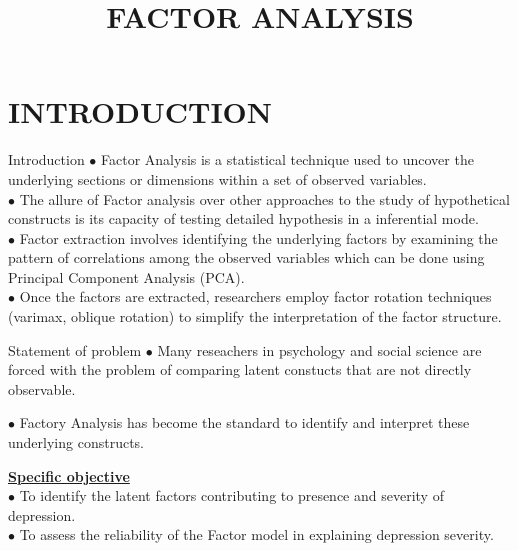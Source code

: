 \documentclass{beamer}
\title{FACTOR ANALYSIS}
\begin{document}
	\maketitle
\section{INTRODUCTION}

\begin{frame}{Introduction}
	$\bullet$ Factor Analysis is a statistical technique used to uncover the underlying sections or dimensions within a set of observed variables. \\
	\vspace{0.2cm}
	$\bullet$ The allure of Factor analysis over other approaches to the study of hypothetical constructs is its capacity of testing detailed hypothesis in a inferential mode.\\
	\vspace{0.2cm}
 $\bullet$ Factor extraction involves identifying the underlying factors by examining the pattern of correlations among the observed variables which can be done using Principal Component Analysis (PCA).\\
	\vspace{0.2cm}
$\bullet$ Once the factors are extracted, researchers employ factor rotation techniques (varimax, oblique rotation) to simplify the interpretation of the factor structure.
\end{frame}

\begin{frame}{Statement of problem}
$\bullet$ Many reseachers in psychology and social science are forced with the problem of comparing latent constucts that are not directly observable.\\
	
\vspace{0.4cm}
	
$\bullet$ Factory Analysis has become the standard to identify and interpret these underlying constructs.\\
\vspace{0.4cm}

\underline{\textbf{Specific objective}}\\

$\bullet$  To identify the latent factors contributing to presence and severity of depression.\\
\vspace{0.4cm}
$\bullet$ To assess the reliability of the Factor model in explaining depression severity.	
\end{frame}
\end{document}
